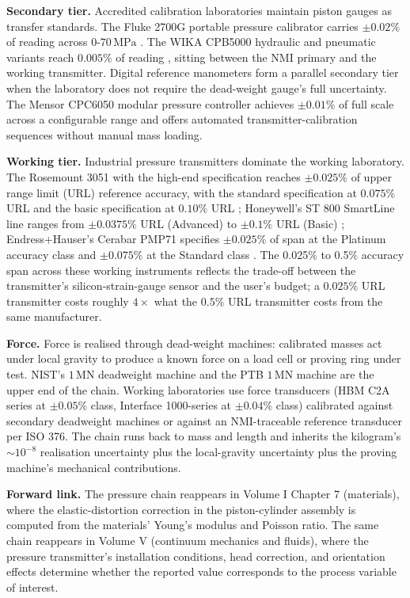 \textbf{Secondary tier.} Accredited calibration laboratories
maintain piston gauges as transfer standards. The Fluke 2700G
portable pressure calibrator carries $\pm 0.02\%$ of reading
across $0$-$70\,\si{\mega\pascal}$ \cite{web:ch03t3b-fluke-2700g}.
The WIKA CPB5000 hydraulic and pneumatic variants reach $0.005\%$
of reading \cite{web:ch03t3b-wika-cpb5000}, sitting between the
NMI primary and the working transmitter. Digital reference
manometers form a parallel secondary tier when the laboratory
does not require the dead-weight gauge's full uncertainty. The
Mensor CPC6050 modular pressure controller achieves $\pm 0.01\%$
of full scale across a configurable range
\cite{web:ch03t3b-mensor-cpc6050} and offers automated
transmitter-calibration sequences without manual mass loading.

\textbf{Working tier.} Industrial pressure transmitters dominate
the working laboratory. The Rosemount 3051 with the high-end
specification reaches $\pm 0.025\%$ of upper range limit (URL)
reference accuracy, with the standard specification at $0.075\%$
URL and the basic specification at $0.10\%$ URL
\cite{web:ch03t3b-rosemount-3051}; Honeywell's ST 800 SmartLine
line ranges from $\pm 0.0375\%$ URL (Advanced) to $\pm 0.1\%$ URL
(Basic) \cite{web:ch03t3b-honeywell-st800}; Endress+Hauser's
Cerabar PMP71 specifies $\pm 0.025\%$ of span at the Platinum
accuracy class and $\pm 0.075\%$ at the Standard class
\cite{web:ch03t3b-eh-cerabar}. The 0.025\% to 0.5\% accuracy span
across these working instruments reflects the trade-off between
the transmitter's silicon-strain-gauge sensor and the user's
budget; a $0.025\%$ URL transmitter costs roughly $4\times$ what
the $0.5\%$ URL transmitter costs from the same manufacturer.

\textbf{Force.} Force is realised through dead-weight machines:
calibrated masses act under local gravity to produce a known
force on a load cell or proving ring under test. NIST's $1\,\si{
\mega\newton}$ deadweight machine and the PTB $1\,\si{\mega
\newton}$ machine are the upper end of the chain. Working
laboratories use force transducers (HBM C2A series at $\pm 0.05\%$
class, Interface 1000-series at $\pm 0.04\%$ class) calibrated
against secondary deadweight machines or against an NMI-traceable
reference transducer per ISO 376. The chain runs back to mass and
length and inherits the kilogram's $\sim 10^{-8}$ realisation
uncertainty plus the local-gravity uncertainty plus the proving
machine's mechanical contributions.

\textbf{Forward link.} The pressure chain reappears in
Volume I Chapter 7 (materials), where the elastic-distortion
correction in the piston-cylinder assembly is computed from the
materials' Young's modulus and Poisson ratio. The same chain
reappears in Volume V (continuum mechanics and fluids), where
the pressure transmitter's installation conditions, head
correction, and orientation effects determine whether the
reported value corresponds to the process variable of interest.

